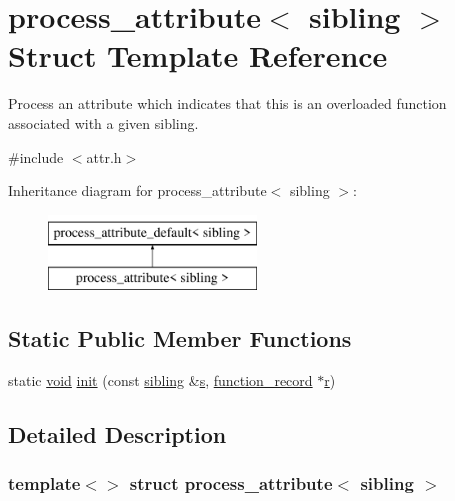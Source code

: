 \hypertarget{structprocess__attribute_3_01sibling_01_4}{}\section{process\+\_\+attribute$<$ sibling $>$ Struct Template Reference}
\label{structprocess__attribute_3_01sibling_01_4}


Process an attribute which indicates that this is an overloaded function associated with a given sibling.  




{\ttfamily \#include $<$attr.\+h$>$}

Inheritance diagram for process\+\_\+attribute$<$ sibling $>$\+:\begin{figure}[H]
\begin{center}
\leavevmode
\includegraphics[height=2.000000cm]{structprocess__attribute_3_01sibling_01_4}
\end{center}
\end{figure}
\subsection*{Static Public Member Functions}
\begin{DoxyCompactItemize}
\item 
static \mbox{\hyperlink{_s_d_l__opengles2__gl2ext_8h_ae5d8fa23ad07c48bb609509eae494c95}{void}} \mbox{\hyperlink{structprocess__attribute_3_01sibling_01_4_a32eab1996a15ef84e77587b8f29d21f3}{init}} (const \mbox{\hyperlink{structsibling}{sibling}} \&\mbox{\hyperlink{_s_d_l__opengl_8h_a4af680a6c683f88ed67b76f207f2e6e4}{s}}, \mbox{\hyperlink{structfunction__record}{function\+\_\+record}} $\ast$\mbox{\hyperlink{_s_d_l__opengl_8h_a42ce7cdc612e53abee15043f80220d97}{r}})
\end{DoxyCompactItemize}


\subsection{Detailed Description}
\subsubsection*{template$<$$>$\newline
struct process\+\_\+attribute$<$ sibling $>$}

